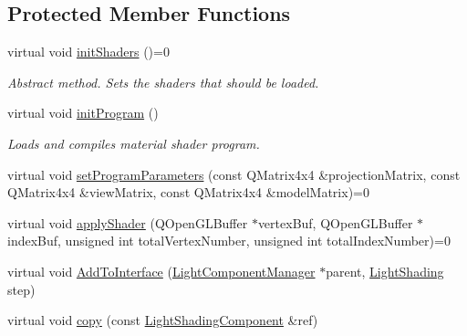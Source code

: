 \subsection*{Protected Member Functions}
\begin{DoxyCompactItemize}
\item 
\mbox{\label{class_geometry_engine_1_1_light_utils_1_1_light_shading_component_ae800a7d739ad8f447a89eb3741e2fabd}} 
virtual void \mbox{\hyperlink{class_geometry_engine_1_1_light_utils_1_1_light_shading_component_ae800a7d739ad8f447a89eb3741e2fabd}{init\+Shaders}} ()=0
\begin{DoxyCompactList}\small\item\em Abstract method. Sets the shaders that should be loaded. \end{DoxyCompactList}\item 
\mbox{\label{class_geometry_engine_1_1_light_utils_1_1_light_shading_component_a8021b18502671a369ac6aa12ab48281d}} 
virtual void \mbox{\hyperlink{class_geometry_engine_1_1_light_utils_1_1_light_shading_component_a8021b18502671a369ac6aa12ab48281d}{init\+Program}} ()
\begin{DoxyCompactList}\small\item\em Loads and compiles material shader program. \end{DoxyCompactList}\item 
virtual void \mbox{\hyperlink{class_geometry_engine_1_1_light_utils_1_1_light_shading_component_a4317565f70bc527ae6de5f4c3a24aa15}{set\+Program\+Parameters}} (const Q\+Matrix4x4 \&projection\+Matrix, const Q\+Matrix4x4 \&view\+Matrix, const Q\+Matrix4x4 \&model\+Matrix)=0
\item 
virtual void \mbox{\hyperlink{class_geometry_engine_1_1_light_utils_1_1_light_shading_component_a6684875f549753d00b91adbf62c88789}{apply\+Shader}} (Q\+Open\+G\+L\+Buffer $\ast$vertex\+Buf, Q\+Open\+G\+L\+Buffer $\ast$index\+Buf, unsigned int total\+Vertex\+Number, unsigned int total\+Index\+Number)=0
\item 
virtual void \mbox{\hyperlink{class_geometry_engine_1_1_light_utils_1_1_light_shading_component_a249c8d383bab7232cc0ad425c9249709}{Add\+To\+Interface}} (\mbox{\hyperlink{class_geometry_engine_1_1_light_utils_1_1_light_component_manager}{Light\+Component\+Manager}} $\ast$parent, \mbox{\hyperlink{namespace_geometry_engine_1_1_light_utils_a16eb370137c2fd151e6f8e1d07cd23e0}{Light\+Shading}} step)
\item 
virtual void \mbox{\hyperlink{class_geometry_engine_1_1_light_utils_1_1_light_shading_component_a1789add4c40a4d059f54fb7a25122700}{copy}} (const \mbox{\hyperlink{class_geometry_engine_1_1_light_utils_1_1_light_shading_component}{Light\+Shading\+Component}} \&ref)
\end{DoxyCompactItemize}
